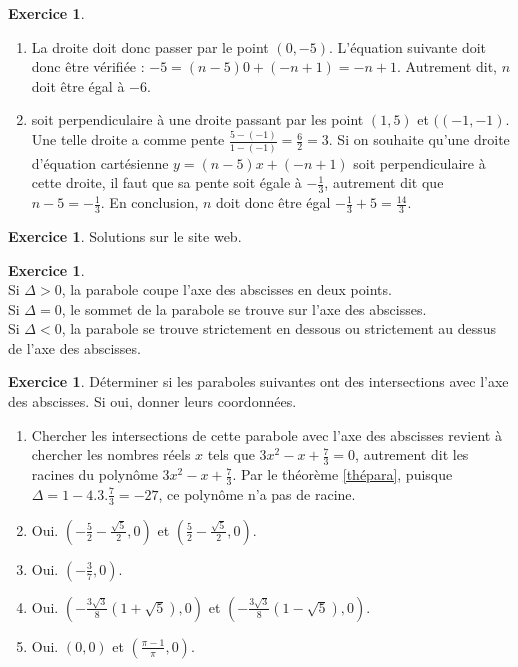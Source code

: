 \documentclass[a4paper,13pt]{scrreprt}
\theoremstyle{plain}
\theoremstyle{definition}
\newtheorem{exo}[subsection]{Exercice}
\begin{document}
\begin{exo} ~~\\
	\begin{enumerate}
		\item La droite doit donc passer par le point $(0,-5)$. L'équation suivante doit donc être vérifiée : $-5=(n-5)0+(-n+1)=-n+1$. Autrement dit, $n$ doit être égal à $-6$.
		\item soit perpendiculaire à une droite passant par les point $(1,5)$ et $((-1,-1)$. Une telle droite a comme pente $\frac{5-(-1)}{1-(-1)}=\frac{6}{2}=3$. Si on souhaite qu'une droite d'équation cartésienne $y=(n-5)x+(-n+1)$ soit perpendiculaire à cette droite, il faut que sa pente soit égale à $-\frac{1}{3}$, autrement dit que $n-5=-\frac{1}{3}$. En conclusion, $n$ doit donc être égal $-\frac{1}{3}+5=\frac{14}{3}$.
	\end{enumerate}
\end{exo}

\begin{exo}
	Solutions sur le site web.
\end{exo}

\begin{exo} ~~\\
	Si $\Delta > 0$, la parabole coupe l'axe des abscisses en deux points. \\
	Si $\Delta = 0$, le sommet de la parabole se trouve sur l'axe des abscisses. \\
	Si $\Delta < 0$, la parabole se trouve strictement en dessous ou strictement au dessus de l'axe des abscisses.
\end{exo}

\begin{exo}
	Déterminer si les paraboles suivantes ont des intersections avec l'axe des abscisses. Si oui, donner leurs coordonnées.
	\begin{enumerate}
		\item Chercher les intersections de cette parabole avec l'axe des abscisses revient à chercher les nombres réels $x$ tels que $3x^2-x+\frac{7}{3}=0$, autrement dit les racines du polynôme $3x^2-x+\frac{7}{3}$. Par le théorème \ref{thépara}, puisque $\Delta = 1 - 4.3.\frac{7}{3} = -27$, ce polynôme n'a pas de racine.
		\item Oui. $(-\frac{5}{2} - \frac{\sqrt{5}}{2},0)$ et $(\frac{5}{2} - \frac{\sqrt{5}}{2},0)$.
		\item Oui. $(-\frac{3}{7},0)$.
		\item Oui. $(-\frac{3\sqrt{3}}{8}(1+ \sqrt{5}),0)$ et $(-\frac{3\sqrt{3}}{8}(1- \sqrt{5}),0)$.
		\item Oui. $(0,0)$ et $(\frac{\pi -1}{\pi },0)$.
	\end{enumerate}
\end{exo}
\end{document}
